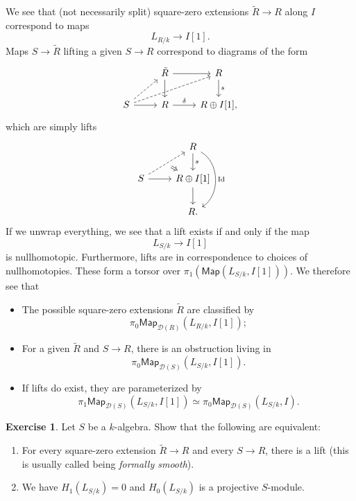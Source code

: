 \documentclass[10pt, oneside]{memoir}
\theoremstyle{definition}
\newtheorem{exer}[thm]{Exercise}
\theoremstyle{remark}
\theoremstyle{plain}
\theoremstyle{definition}
\theoremstyle{remark}
\newcommand{\mc}[1]{\mathcal{#1}}
\newcommand{\mr}[1]{\mathrm{#1}}
\newcommand{\ms}[1]{\mathsf{#1}}
\newcommand{\1}{\mathbf{1}}
\newcommand{\2}{\mathbf{2}}
\newcommand{\3}{\mathbf{3}}
\begin{document}
We see that (not necessarily split) square-zero extensions \(\tilde{R} \to R \) along \(I \) correspond to maps
\[ L_{R/k} \to I[1]. \]
Maps \(S \to \tilde{R} \) lifting a given \(S \to R \) correspond to diagrams of the form
\begin{equation*}
\begin{tikzcd}
    & \tilde{R} \ar{r} \ar{d} & R \ar{d}{s} \\
    S \ar[dashrightarrow]{ur} \ar[dashrightarrow]{urr} \ar{r} & R \ar{r}{\delta} & R \oplus I[1],
\end{tikzcd}
\end{equation*}
which are simply lifts
\begin{equation*}
\begin{tikzcd}
    & R \ar{d}{s} \ar[bend left=60]{dd}{\mr{Id}} \\
    S \ar[dashrightarrow,""{swap,name=L}]{ur} \ar{r} & R \oplus I[1] \ar{d} \ar[Leftarrow, to=L] \\
    & R.
\end{tikzcd}
\end{equation*}
If we unwrap everything, we see that a lift exists if and only if the map
\[ L_{S/k} \to I[1] \]
is nullhomotopic. Furthermore, lifts are in correspondence to choices of nullhomotopies. These form a torsor over \(\pi_1(\ms{Map}(L_{S/k}, I[1])) \). We therefore see that
\begin{itemize}
    \item The possible square-zero extensions \(\tilde{R} \) are classified by
    \[ \pi_0 \ms{Map}_{\mc{D}(R)} (L_{R/k}, I[1]); \]
    \item For a given \(\tilde{R} \) and \(S \to R \), there is an obstruction living in
    \[ \pi_0 \ms{Map}_{\mc{D}(S)} (L_{S/k}, I[1]). \]
    \item If lifts do exist, they are parameterized by
    \[ \pi_1 \ms{Map}_{\mc{D}(S)} (L_{S/k}, I[1]) \simeq \pi_0 \ms{Map}_{\mc{D}(S)}(L_{S/k}, I). \]
\end{itemize}

\begin{exer}
    Let \(S \) be a \(k \)-algebra. Show that the following are equivalent:
    \begin{enumerate}
        \item For every square-zero extension \(\tilde{R} \to R \) and every \(S \to R \), there is a lift (this is usually called being \textit{formally smooth}).
        \item We have \(H_1(L_{S/k})= 0 \) and \(H_0(L_{S/k}) \) is a projective \(S \)-module.
    \end{enumerate}
\end{exer}
\end{document}
